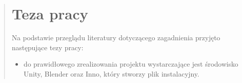 \begin{quotation}
\newpage
\section{Teza pracy}

Na podstawie przeglądu literatury dotyczącego zagadnienia przyjęto następujące tezy pracy:
\begin{itemize}
\item do prawidłowego zrealizowania projektu wystarczające jest środowisko Unity, Blender oraz Inno, który stworzy plik instalacyjny.
\end{itemize}

\end{quotation}
